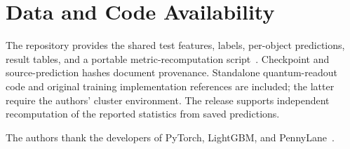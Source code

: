 \documentclass[aps,a4paper,onecolumn,11pt,unpublished]{quantumarticle}
\begin{document}
\section{Data and Code Availability}

The repository provides the shared test features, labels, per-object predictions, result tables, and a portable metric-recomputation script~\cite{artifacts}. Checkpoint and source-prediction hashes document provenance. Standalone quantum-readout code and original training implementation references are included; the latter require the authors' cluster environment. The release supports independent recomputation of the reported statistics from saved predictions.

\begin{acknowledgments}
The authors thank the developers of PyTorch, LightGBM, and PennyLane~\cite{pennylane}.
\end{acknowledgments}
\end{document}

